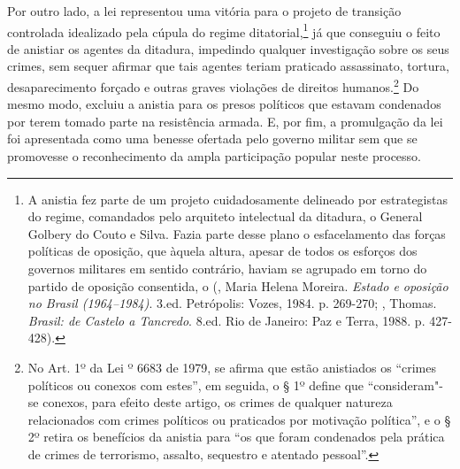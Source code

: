 Por outro lado, a lei representou uma vitória para o projeto de
transição controlada idealizado pela cúpula do regime
ditatorial,\footnote{A anistia fez parte de um projeto cuidadosamente
  delineado por estrategistas do regime, comandados pelo arquiteto
  intelectual da ditadura, o General Golbery do Couto e Silva. Fazia
  parte desse plano o esfacelamento das forças políticas de oposição,
  que àquela altura, apesar de todos os esforços dos governos militares
  em sentido contrário, haviam se agrupado em torno do partido de
  oposição consentida, o  (, Maria Helena Moreira.
  \emph{Estado e oposição no Brasil (1964--1984)}. 3.ed. Petrópolis:
  Vozes, 1984. p. 269-270; , Thomas. \emph{Brasil: de Castelo
  a Tancredo}. 8.ed. Rio de Janeiro: Paz e Terra, 1988. p. 427-428).} já
que conseguiu o feito de anistiar os agentes da ditadura, impedindo
qualquer investigação sobre os seus crimes, sem sequer afirmar que tais
agentes teriam praticado assassinato, tortura, desaparecimento forçado e
outras graves violações de direitos humanos.\footnote{No Art. 1º da Lei
  º 6683 de 1979, se afirma que estão anistiados os ``crimes políticos
  ou conexos com estes'', em seguida, o § 1º define que ``consideram"-se
      conexos, para efeito deste artigo, os crimes de qualquer natureza
      relacionados com crimes políticos ou praticados por motivação
      política'', e o § 2º retira os benefícios da anistia para ``os que foram
              condenados pela prática de crimes de terrorismo, assalto, sequestro e
              atentado pessoal''.} Do mesmo modo, excluiu a anistia para os presos
políticos que estavam condenados por terem tomado parte na resistência
armada. E, por fim, a promulgação da lei foi apresentada como uma
benesse ofertada pelo governo militar sem que se promovesse o
reconhecimento da ampla participação popular neste processo.

